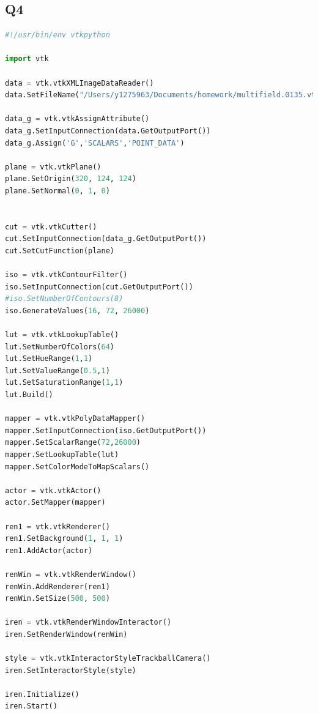 \documentclass[11pt]{scrartcl}
\begin{document}
\subsection{Q4}
\label{code:Q4}
\begin{lstlisting}[language=Python]
#!/usr/bin/env vtkpython

import vtk

data = vtk.vtkXMLImageDataReader()
data.SetFileName("/Users/y1275963/Documents/homework/multifield.0135.vti")

data_g = vtk.vtkAssignAttribute()
data_g.SetInputConnection(data.GetOutputPort())
data_g.Assign('G','SCALARS','POINT_DATA')

plane = vtk.vtkPlane()
plane.SetOrigin(320, 124, 124)
plane.SetNormal(0, 1, 0)


cut = vtk.vtkCutter()
cut.SetInputConnection(data_g.GetOutputPort())
cut.SetCutFunction(plane)

iso = vtk.vtkContourFilter()
iso.SetInputConnection(cut.GetOutputPort())
#iso.SetNumberOfContours(8)
iso.GenerateValues(16, 72, 26000)

lut = vtk.vtkLookupTable()
lut.SetNumberOfColors(64)
lut.SetHueRange(1,1)
lut.SetValueRange(0.5,1)
lut.SetSaturationRange(1,1)
lut.Build()

mapper = vtk.vtkPolyDataMapper()
mapper.SetInputConnection(iso.GetOutputPort())
mapper.SetScalarRange(72,26000)
mapper.SetLookupTable(lut)
mapper.SetColorModeToMapScalars()

actor = vtk.vtkActor()
actor.SetMapper(mapper)

ren1 = vtk.vtkRenderer()
ren1.SetBackground(1, 1, 1)
ren1.AddActor(actor)

renWin = vtk.vtkRenderWindow()
renWin.AddRenderer(ren1)
renWin.SetSize(500, 500)

iren = vtk.vtkRenderWindowInteractor()
iren.SetRenderWindow(renWin)

style = vtk.vtkInteractorStyleTrackballCamera()
iren.SetInteractorStyle(style)

iren.Initialize()
iren.Start()
\end{lstlisting}
\end{document}
